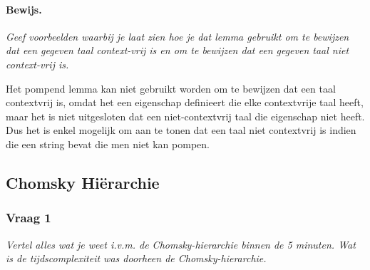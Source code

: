 

\paragraph{Bewijs.} 

\textit{Geef voorbeelden waarbij je laat zien hoe je dat lemma gebruikt om te bewijzen dat een gegeven taal context-vrij is en om te bewijzen dat een gegeven taal niet context-vrij is.}

Het pompend lemma kan niet gebruikt worden om te bewijzen dat een taal contextvrij is, omdat het een eigenschap definieert die elke contextvrije taal heeft, maar het is niet uitgesloten dat een niet-contextvrij taal die eigenschap niet heeft. Dus het is enkel mogelijk om aan te tonen dat een taal niet contextvrij is indien die een string bevat die men niet kan pompen.



\subsection{Chomsky Hi\"erarchie}

\subsubsection{Vraag 1}

\textit{Vertel alles wat je weet i.v.m. de Chomsky-hierarchie binnen de 5 minuten. Wat is de tijdscomplexiteit was doorheen de Chomsky-hierarchie.}

